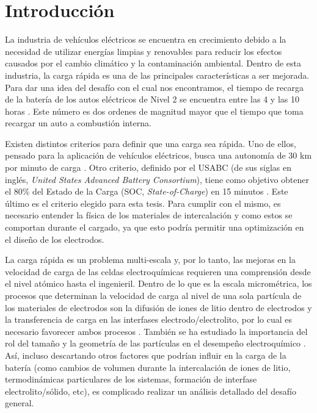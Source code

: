 \section{Introducción}

La industria de vehículos eléctricos se encuentra en crecimiento debido a la
necesidad de utilizar energías limpias y renovables para reducir los efectos 
causados por el cambio climático y la contaminación ambiental. Dentro de esta 
industria, la carga rápida es una de las principales características a ser 
mejorada. Para dar una idea del desafío con el cual nos encontramos, el tiempo 
de recarga de la batería de los autos eléctricos de Nivel 2 se encuentra entre 
las 4 y las 10 horas \cite{evcs}. Este número es dos ordenes de magnitud 
mayor que el tiempo que toma recargar un auto a combustión interna.

Existen distintos criterios para definir que una carga sea rápida. Uno de ellos, 
pensado para la aplicación de vehículos eléctricos, busca una autonomía de 30 km 
por minuto de carga \cite{dufek2022}. Otro criterio, definido por el USABC (de sus
siglas en inglés, \textit{United States Advanced Battery Consortium}), tiene como
objetivo obtener el 80\% del Estado de la Carga (SOC, \textit{State-of-Charge})
en 15 minutos \cite{USABC}. Este último es el criterio elegido para esta tesis.
Para cumplir con el mismo, es necesario entender la física de los materiales de
intercalación y como estos se comportan durante el cargado, ya que esto podría 
permitir una optimización en el diseño de los electrodos.

La carga rápida es un problema multi-escala \cite{franco2013, franco2019} y, por 
lo tanto, las mejoras en la velocidad de carga de las celdas electroquímicas 
requieren una comprensión desde el nivel atómico hasta el ingenieril. Dentro 
de lo que es la escala micrométrica, los procesos que determinan la velocidad de 
carga al nivel de una sola partícula de los materiales de electrodos son la 
difusión de iones de litio dentro de electrodos y la transferencia de carga en 
las interfases electrodo/electrolito, por lo cual es necesario favorecer ambos
procesos \cite{liu2019, tomaszewska2019, weiss2021}. También se ha estudiado la 
importancia del rol del tamaño y la geometría de las partículas en el desempeño 
electroquímico \cite{gavilan2020, gavilan2022}. Así, incluso descartando
otros factores que podrían influir en la carga de la batería (como cambios de 
volumen durante la intercalación de iones de litio, termodinámicas particulares
de los sistemas, formación de interfase electrolito/sólido, etc), es complicado
realizar un análisis detallado del desafío general.

